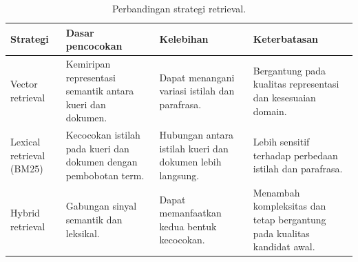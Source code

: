 \begin{table}[htbp]
    \centering
    \caption{Perbandingan strategi retrieval.}
    \label{tab:bab2.3-strategi-retrieval}

    \begin{tabularx}{\textwidth}{@{}p{2.9cm}L L L@{}}
        \hline
        \textbf{Strategi}
        & \textbf{Dasar pencocokan}
        & \textbf{Kelebihan}
        & \textbf{Keterbatasan} \\
        \hline

        Vector retrieval
        &
        Kemiripan representasi semantik antara kueri dan dokumen.
        &
        Dapat menangani variasi istilah dan parafrasa.
        &
        Bergantung pada kualitas representasi dan kesesuaian domain.
        \\

        Lexical retrieval (BM25)
        &
        Kecocokan istilah pada kueri dan dokumen dengan pembobotan term.
        &
        Hubungan antara istilah kueri dan dokumen lebih langsung.
        &
        Lebih sensitif terhadap perbedaan istilah dan parafrasa.
        \\

        Hybrid retrieval
        &
        Gabungan sinyal semantik dan leksikal.
        &
        Dapat memanfaatkan kedua bentuk kecocokan.
        &
        Menambah kompleksitas dan tetap bergantung pada kualitas kandidat awal.
        \\

        \hline
    \end{tabularx}


\end{table}